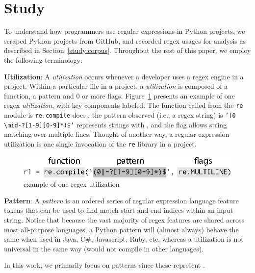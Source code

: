 \section{Study}
\label{sec:study}

To understand how programmers use regular expressions in Python projects, we scraped  Python projects from GitHub, and recorded regex usages for analysis as described in Section~\ref{study:corpus}.
Throughout the rest of this paper, we  employ the following terminology:

\noindent \textbf{Utilization}: A \emph{utilization} occurs whenever a developer uses a regex engine in a project.  Within a particular file in a project, a \emph{utilization} is composed of a function, a pattern and 0 or more flags.  Figure~\ref{fig:exampleUsage} presents an example of one regex \emph{utilization}, with key components labeled. The function called from the {\tt re} module is {\tt re.compile} does , the pattern observed (i.e., a regex string) is {\tt `(0 $\mid$-?[1-9][0-9]*)\$'} represents strings with , and the flag allows string matching over multiple lines.
Thought of another way, a regular expression  utilization is one single invocation of the {\tt re} library in a project.

\begin{figure}[htb]
\centering
\includegraphics[width=\columnwidth]{../illustrations/exampleUsage.eps}
\caption{example of one regex utilization}
\label{fig:exampleUsage}
\end{figure}



\noindent \textbf{Pattern}: A \emph{pattern} is an ordered series of regular expression language feature tokens that can be used to find match start and end indices within an input string.  Notice that because the vast majority of regex features are shared across most all-purpose languages, a Python {pattern} will (almost always) behave the same when used in Java, C\#, Javascript, Ruby, etc, whereas a {utilization} is not universal in the same way (would not compile in other languages).

In this work, we primarily focus on patterns since these represent . 


